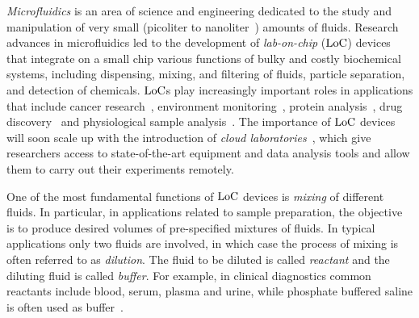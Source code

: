 


\emph{Microfluidics} is an area of science and engineering dedicated to the study and 
manipulation of very small (picoliter to nanoliter~\cite{hsieh2012reagent}) amounts of 
fluids. Research advances in microfluidics led to the development of 
\emph{lab-on-chip} ($\text{LoC}$) devices that integrate on a small chip
various functions of bulky and costly biochemical systems, including 
dispensing, mixing, and filtering of fluids, particle separation, and detection of chemicals.
$\text{LoC}$s play increasingly important roles in applications that include
cancer research~\cite{li2013probing}, 
environment monitoring~\cite{marle2005microfluidic}, 
protein analysis~\cite{xu2010defect}, 
drug discovery~\cite{einav2008discovery} and physiological 
sample analysis~\cite{srinivasan2004integrated}.
The importance of $\text{LoC}$ devices will soon scale up with the introduction of 
\emph{cloud laboratories}~\cite{hayden2014automated}, 
which give researchers access to state-of-the-art equipment and data analysis tools and
allow them to carry out their experiments remotely.

One of the most fundamental functions of $\text{LoC}$ devices is \emph{mixing} of different fluids.
In particular, in applications related to sample preparation,
the objective is to produce desired volumes of pre-specified mixtures of fluids.
In typical applications only two fluids are involved, in which case
the process of mixing is often referred to as \emph{dilution}. The
fluid to be diluted is called \emph{reactant} and the diluting fluid is called \emph{buffer}.
For example, in clinical diagnostics common reactants include blood, serum, plasma and urine, while
phosphate buffered saline is often used as buffer~\cite{srinivasan2004integrated}.

